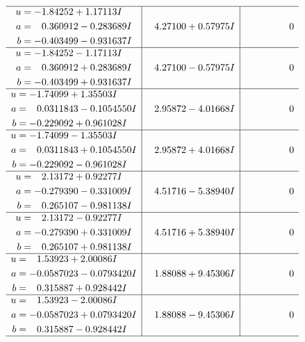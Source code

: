 \documentclass[1p]{elsarticle_modified}
\theoremstyle{definition}
\begin{document}
$$\begin{array}{c|c|c}
 \hline 
\begin{aligned}
u &= -1.84252 + 1.17113 I \\
a &= \phantom{-}0.360912 - 0.283689 I \\
b &= -0.403499 - 0.931637 I\end{aligned}
 & \phantom{-}4.27100 + 0.57975 I & \phantom{-0.000000 } 0 \\ \hline\begin{aligned}
u &= -1.84252 - 1.17113 I \\
a &= \phantom{-}0.360912 + 0.283689 I \\
b &= -0.403499 + 0.931637 I\end{aligned}
 & \phantom{-}4.27100 - 0.57975 I & \phantom{-0.000000 } 0 \\ \hline\begin{aligned}
u &= -1.74099 + 1.35503 I \\
a &= \phantom{-}0.0311843 - 0.1054550 I \\
b &= -0.229092 + 0.961028 I\end{aligned}
 & \phantom{-}2.95872 - 4.01668 I & \phantom{-0.000000 } 0 \\ \hline\begin{aligned}
u &= -1.74099 - 1.35503 I \\
a &= \phantom{-}0.0311843 + 0.1054550 I \\
b &= -0.229092 - 0.961028 I\end{aligned}
 & \phantom{-}2.95872 + 4.01668 I & \phantom{-0.000000 } 0 \\ \hline\begin{aligned}
u &= \phantom{-}2.13172 + 0.92277 I \\
a &= -0.279390 - 0.331009 I \\
b &= \phantom{-}0.265107 - 0.981138 I\end{aligned}
 & \phantom{-}4.51716 - 5.38940 I & \phantom{-0.000000 } 0 \\ \hline\begin{aligned}
u &= \phantom{-}2.13172 - 0.92277 I \\
a &= -0.279390 + 0.331009 I \\
b &= \phantom{-}0.265107 + 0.981138 I\end{aligned}
 & \phantom{-}4.51716 + 5.38940 I & \phantom{-0.000000 } 0 \\ \hline\begin{aligned}
u &= \phantom{-}1.53923 + 2.00086 I \\
a &= -0.0587023 - 0.0793420 I \\
b &= \phantom{-}0.315887 + 0.928442 I\end{aligned}
 & \phantom{-}1.88088 + 9.45306 I & \phantom{-0.000000 } 0 \\ \hline\begin{aligned}
u &= \phantom{-}1.53923 - 2.00086 I \\
a &= -0.0587023 + 0.0793420 I \\
b &= \phantom{-}0.315887 - 0.928442 I\end{aligned}
 & \phantom{-}1.88088 - 9.45306 I & \phantom{-0.000000 } 0\\
 \hline 
 \end{array}$$\newpage\newpage\renewcommand{\arraystretch}{1}
\end{document}
